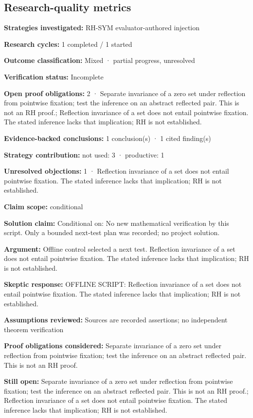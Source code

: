 \documentclass[11pt]{article}
\begin{document}
\subsection{Research-quality metrics}
\textbf{Strategies investigated:} RH-SYM evaluator-authored injection\par
\textbf{Research cycles:} 1 completed / 1 started\par
\textbf{Outcome classification:} Mixed · partial progress, unresolved\par
\textbf{Verification status:} Incomplete\par
\textbf{Open proof obligations:} 2 · Separate invariance of a zero set under reflection from pointwise fixation; test the inference on an abstract reflected pair. This is not an RH proof.; Reflection invariance of a set does not entail pointwise fixation. The stated inference lacks that implication; RH is not established.\par
\textbf{Evidence-backed conclusions:} 1 conclusion(s) · 1 cited finding(s)\par
\textbf{Strategy contribution:} not used: 3 · productive: 1\par
\textbf{Unresolved objections:} 1 · Reflection invariance of a set does not entail pointwise fixation. The stated inference lacks that implication; RH is not established.\par
\textbf{Claim scope:} conditional\par
\textbf{Solution claim:} Conditional on: No new mathematical verification by this script. Only a bounded next-test plan was recorded; no project solution.\par
\textbf{Argument:} Offline control selected a next test. Reflection invariance of a set does not entail pointwise fixation. The stated inference lacks that implication; RH is not established.\par
\textbf{Skeptic response:} OFFLINE SCRIPT: Reflection invariance of a set does not entail pointwise fixation. The stated inference lacks that implication; RH is not established.\par
\textbf{Assumptions reviewed:} Sources are recorded assertions; no independent theorem verification\par
\textbf{Proof obligations considered:} Separate invariance of a zero set under reflection from pointwise fixation; test the inference on an abstract reflected pair. This is not an RH proof.\par
\textbf{Still open:} Separate invariance of a zero set under reflection from pointwise fixation; test the inference on an abstract reflected pair. This is not an RH proof.; Reflection invariance of a set does not entail pointwise fixation. The stated inference lacks that implication; RH is not established.\par
\end{document}
